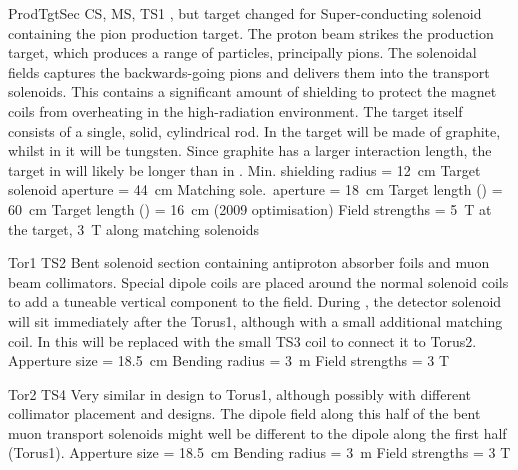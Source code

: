 {ProdTgtSec}
{CS, MS, TS1}
{\phaseI, but target changed for \phaseII}
{Super-conducting solenoid containing the pion production target.  The proton beam strikes the production target, which produces a range of particles, principally pions.  The solenoidal fields captures the backwards-going pions and delivers them into the transport solenoids.  This contains a significant amount of shielding to protect the magnet coils from overheating in the high-radiation environment.  The target itself consists of a single, solid, cylindrical rod.  In \phaseI the target will be made of graphite, whilst in \phaseII it will be tungsten. Since graphite has a larger interaction length, the target in \phaseI will likely be longer than in \phaseII.}
{Min. shielding radius = 12~cm\newline%
 Target solenoid aperture = 44~cm\newline%
 Matching sole.\ aperture = 18~cm\newline%
 Target length (\phaseI) = 60~cm\newline%
 Target length (\phaseII) = \quad \newline\hfill16~cm (2009 optimisation)\newline%
 Field strengths = 5~T at the target, 3~T along matching solenoids\newline
\vspace{1cm}{}}

{Tor1}
{TS2}
{\phaseI }
{Bent solenoid section containing antiproton absorber foils and muon beam collimators.  Special dipole coils are placed around the normal solenoid coils to add a tuneable vertical component to the field.  During \phaseI, the detector solenoid will sit immediately after the Torus1, although with a small additional matching coil.  In \phaseII this will be replaced with the small TS3 coil to connect it to Torus2.}
{Apperture size = 18.5~cm\newline%
 Bending radius = 3~m \newline%
Field strengths = 3 T\vspace{1.5cm}}

{Tor2}
{TS4}
{\phaseII}
{Very similar in design to Torus1, although possibly with different collimator placement and designs. The dipole field along this half of the bent muon transport solenoids might well be different to the dipole along the first half (Torus1).}
{Apperture size = 18.5~cm\newline%
 Bending radius = 3~m\newline%
 Field strengths = 3 T}


